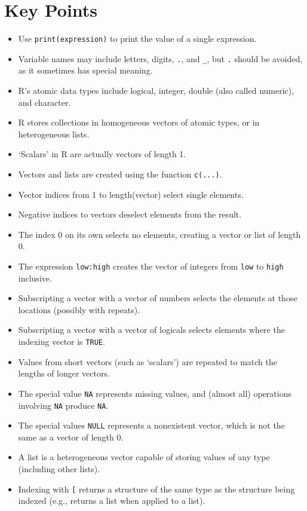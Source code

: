 \section{Key Points}

\begin{itemize}
\item
  Use \texttt{print(expression)} to print the value of a single expression.
\item
  Variable names may include letters, digits, \texttt{.}, and \texttt{\_}, but \texttt{.} should be avoided, as it sometimes has special meaning.
\item
  R's atomic data types include logical, integer, double (also called numeric), and character.
\item
  R stores collections in homogeneous vectors of atomic types, or in heterogeneous lists.
\item
  `Scalars' in R are actually vectors of length 1.
\item
  Vectors and lists are created using the function \texttt{c(...)}.
\item
  Vector indices from 1 to length(vector) select single elements.
\item
  Negative indices to vectors deselect elements from the result.
\item
  The index 0 on its own selects no elements, creating a vector or list of length 0.
\item
  The expression \texttt{low:high} creates the vector of integers from \texttt{low} to \texttt{high} inclusive.
\item
  Subscripting a vector with a vector of numbers selects the elements at those locations (possibly with repeats).
\item
  Subscripting a vector with a vector of logicals selects elements where the indexing vector is \texttt{TRUE}.
\item
  Values from short vectors (such as `scalars') are repeated to match the lengths of longer vectors.
\item
  The special value \texttt{NA} represents missing values, and (almost all) operations involving \texttt{NA} produce \texttt{NA}.
\item
  The special values \texttt{NULL} represents a nonexistent vector, which is not the same as a vector of length 0.
\item
  A list is a heterogeneous vector capable of storing values of any type (including other lists).
\item
  Indexing with \texttt{[} returns a structure of the same type as the structure being indexed (e.g., returns a list when applied to a list).

\end{itemize}

